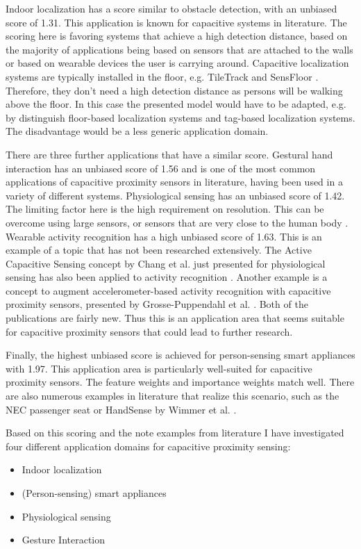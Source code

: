 Indoor localization has a score similar to obstacle detection, with an unbiased score of 1.31. This application is known for capacitive systems in literature. The scoring here is favoring systems that achieve a high detection distance, based on the majority of applications being based on sensors that are attached to the walls or based on wearable devices the user is carrying around. Capacitive localization systems are typically installed in the floor, e.g. TileTrack \cite{Valtonen2009a} and SensFloor \cite{lauterbach2009}. Therefore, they don't need a high detection distance as persons will be walking above the floor. In this case the presented model would have to be adapted, e.g. by distinguish floor-based localization systems and tag-based localization systems. The disadvantage would be a less generic application domain.

There are three further applications that have a similar score. Gestural hand interaction has an unbiased score of 1.56 and is one of the most common applications of capacitive proximity sensors in literature, having been used in a variety of different systems. Physiological sensing has an unbiased score of 1.42. The limiting factor here is the high requirement on resolution. This can be overcome using large sensors, or sensors that are very close to the human body \cite{cheng2010active}. Wearable activity recognition has a high unbiased score of 1.63. This is an example of a topic that has not been researched extensively. The Active Capacitive Sensing concept by Chang et al. just presented for physiological sensing has also been applied to activity recognition \cite{cheng2010active}. Another example is a concept to augment accelerometer-based activity recognition with capacitive proximity sensors, presented by Grosse-Puppendahl et al. \cite{grosse2012enhancing}. Both of the publications are fairly new. Thus this is an application area that seems suitable for capacitive proximity sensors that could lead to further research.

Finally, the highest unbiased score is achieved for person-sensing smart appliances with 1.97. This application area is particularly well-suited for capacitive proximity sensors. The feature weights and importance weights match well. There are also numerous examples in literature that realize this scenario, such as the NEC passenger seat \cite{smith1999thesis} or HandSense by Wimmer et al. \cite{wimmer2009handsense}.

Based on this scoring and the note examples from literature I have investigated four different application domains for capacitive proximity sensing:
\begin{itemize}
\item Indoor localization
\item (Person-sensing) smart appliances
\item Physiological sensing
\item Gesture Interaction
\end{itemize}

